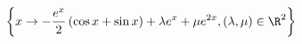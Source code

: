 \begin{displaymath}
 \left\lbrace 
x\rightarrow -\frac{e^{x}}{2}\left(\cos x +\sin x \right) +\lambda e^x + \mu e^{2x},(\lambda,\mu)\in \R^2 
\right\rbrace 
\end{displaymath}
